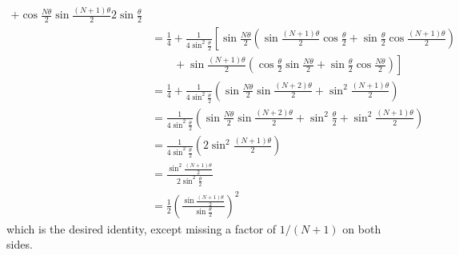 \begin{solution}
\[\begin{aligned}
{            + \cos \frac{N\theta}{2} \sin \frac{(N+1)\theta}{2}}
        {2 \sin \frac{\theta}{2}}
\\
&=\frac{1}{4} + \frac{1}{4 \sin^2 \frac{\theta}{2}} \left[
    \sin \frac{N\theta}{2} \left(
        \sin \frac{(N+1)\theta}{2} \cos \frac{\theta}{2} +
        \sin \frac{\theta}{2} \cos \frac{(N+1)\theta}{2} \right)
\right. \\
&\qquad + \left.
    \sin \frac{(N+1)\theta}{2} \left(
        \cos \frac{\theta}{2} \sin \frac{N\theta}{2} +
        \sin \frac{\theta}{2} \cos \frac{N\theta}{2}
    \right)
 \right] \\
&=\frac{1}{4} + \frac{1}{4 \sin^2 \frac{\theta}{2}} \left(
\sin \frac{N \theta}{2} \sin \frac{(N+2)\theta}{2} + \sin^2 \frac{(N+1)\theta}{2}
    \right) \\
&=\frac{1}{4 \sin^2 \frac{\theta}{2}} \left(
\sin \frac{N \theta}{2} \sin \frac{(N+2)\theta}{2} + \sin^2 \frac{\theta}{2} + \sin^2 \frac{(N+1)\theta}{2}
    \right) \\
&=\frac{1}{4 \sin^2 \frac{\theta}{2}} \left(
2\sin^2 \frac{(N+1)\theta}{2}
    \right) \\
&=\frac{\sin^2 \frac{(N+1)\theta}{2}}{2 \sin^2 \frac{\theta}{2}} \\
&= \frac{1}{2} \left(\frac{\sin \frac{(N+1)\theta}{2}}{\sin \frac{\theta}{2}}\right)^2
\end{aligned} \]
which is the desired identity, except missing a factor of \(1/(N+1)\) on both sides.
\end{solution}

